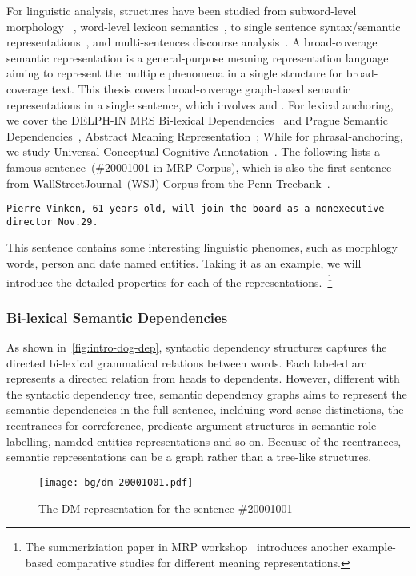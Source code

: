 For linguistic analysis, structures have been studied from
subword-level morphology ~\citep{beesley2003finite}, word-level
lexicon semantics~\citep{miller1998wordnet}, to single sentence
syntax/semantic
representations~\citep{baker1998berkeley,palmer2005proposition,collins2003head},
and multi-sentences discourse
analysis~\citep{carlson2003building,wolf2005representing,prasad2008penn}. A
broad-coverage semantic representation is a general-purpose meaning
representation language aiming to represent the multiple phenomena in
a single structure for broad-coverage text. This thesis covers
broad-coverage graph-based semantic representations in a single
sentence, which involves  and
. For lexical anchoring, we cover the DELPH-IN
MRS Bi-lexical Dependencies~\cite[DM,][]{ivanova2012did} and Prague
Semantic
Dependencies~\cite[PSD,][]{hajic2012announcing,miyao2014house},
Abstract Meaning Representation~\cite[AMR,][]{Ban:Bon:Cai:13}; While
for phrasal-anchoring, we study Universal Conceptual Cognitive
Annotation~\cite[UCCA,][]{Abe:Rap:13b}. The following lists a famous
sentence~(\#20001001 in MRP Corpus), which is also the first sentence
from WallStreetJournal~(WSJ) Corpus from the Penn
Treebank~\citep{Mar:San:Mar:93}.

\texttt{Pierre Vinken, 61 years old, will join the board as a nonexecutive director Nov.29.}

This sentence contains some interesting linguistic phenomes, such as
morphlogy words, person and date named entities. Taking it as an
example, we will introduce the detailed properties for each of the
representations.~\footnote{The summeriziation paper in MRP
  workshop~\citep{Mar:San:Mar:93} introduces another example-based
  comparative studies for different meaning representations.}

\subsubsection{Bi-lexical Semantic Dependencies}
\label{ssec:bg:bi-leixcal}

As shown in~\autoref{fig:intro-dog-dep}, syntactic dependency
structures captures the directed bi-lexical grammatical relations
between words. Each labeled arc represents a directed relation from
heads to dependents. However, different with the syntactic dependency
tree, semantic dependency graphs aims to represent the semantic
dependencies in the full sentence, inclduing word sense distinctions,
the reentrances for correference, predicate-argument structures in
semantic role labelling, namded entities representations and so
on. Because of the reentrances, semantic representations can be a
graph rather than a tree-like structures.
\begin{figure}[!th]
\centering
\texttt{[image: bg/dm-20001001.pdf]}
\caption{\label{fig:bg-dm}The DM representation for the sentence
  \#20001001}
\end{figure}

